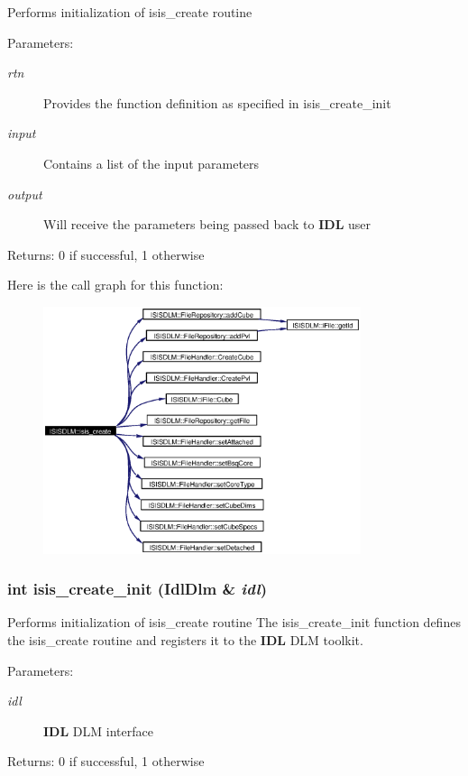 Performs initialization of isis\_\-create routine \begin{Desc}
\item[Parameters:]
\begin{description}
\item[{\em rtn}]Provides the function definition as specified in isis\_\-create\_\-init \item[{\em input}]Contains a list of the input parameters \item[{\em output}]Will receive the parameters being passed back to {\bf IDL} user \end{description}
\end{Desc}
\begin{Desc}
\item[Returns:]0 if successful, 1 otherwise \end{Desc}


Here is the call graph for this function:\begin{figure}[H]
\begin{center}
\leavevmode
\includegraphics[width=264pt]{namespaceISISDLM_a14_cgraph}
\end{center}
\end{figure}
\subsubsection{\setlength{\rightskip}{0pt plus 5cm}int isis\_\-create\_\-init (Idl\-Dlm \& {\em idl})}\label{namespaceISISDLM_a13}


Performs initialization of isis\_\-create routine The isis\_\-create\_\-init function defines the isis\_\-create routine and registers it to the {\bf IDL} DLM toolkit. \begin{Desc}
\item[Parameters:]
\begin{description}
\item[{\em idl}]{\bf IDL} DLM interface \end{description}
\end{Desc}
\begin{Desc}
\item[Returns:]0 if successful, 1 otherwise \end{Desc}


